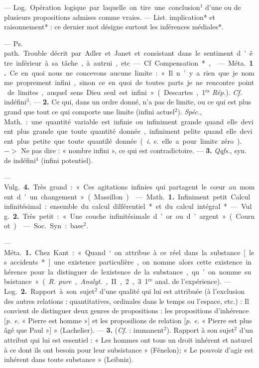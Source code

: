 \begin{itemize}[leftmargin=1cm, label=, itemsep=1pt]
 — \si{Log.} Opération logique
par laquelle on tire une conclusion$^1$
d’une ou de plusieurs propositions
admises comme vraies. — List.
implication* et raisonnement* : ce
dernier mot désigne surtout les inférences médiales*.

— \si{Ps. path.} Trouble décrit par
Adler et Janet et consistant dans le
sentiment d'être inférieur à sa
tâche, à autrui, etc — Cf Compensation*,

 — \si{Méta.} {\bf 1.} Ce en quoi nous ne
concevons aucune limite : « Il n’y a
rien que je nomme proprement
infini, sinon ce en quoi de toutes
parts je ne rencontre point de limites, auquel sens Dieu seul est
infini » (Descartes, 1$^\text{es}$ {\it Rép.}). {\it {\it Cf.}}
indéfini$^3$. — {\bf 2.} Ce qui, dans un
ordre donné, n'a pas de limite, ou
ce qui est plus grand que tout ce
qui comporte une limite (infini
actuel$^2$). {\it Spéc.}, \si{Math.} : une quantité
variable est infinie ou infiniment
grande quand elle devient plus
grande que toute quantité donnée,
infiniment pelite quand elle devient
plus petite que toute quantilé
donnée ({\it i. e.} elle a pour limite zéro).
$->$ Ne pas dire : « nombre infini »,
ce qui est contradictoire. — {\bf 3.} {\it Qqfs.},
syn. de indéfini$^4$ (infini potentiel).

— \si{Vulg.} {\bf 4.} Très grand : « Ces
agitations infinies qui partagent le
cœur au moment d’un changement » (Massillon).

 — \si{Math.} {\bf 1.} Infiniment
petit. Calcul infinitésimal : ensemble
du calcul dilférentiel* et du calcul
intégral*.

— \si{Vulg.} {\bf 2.} Très petit : « Une
couche infinitésimale d’or ou d’argent » (Cournot).

 — \si{Soc.} Syn. : base$^2$.

 — \si{Méta.} {\bf 1.} Chez Kant :
« Quand ‘on attribue à ce réel dans
la substance [les accidents*] une
existence particulière, on nomme
alors cette existence inhérence pour
la distinguer de lexistence de la
substance, qu’on nomme subsistance » ({\it R. pure}, {\it Analyt.}, II, 2, 3
1$^\text{re}$ anal. de l'expérience). — \si{Log.}
 {\bf 2.} Rapport à son sujet$^2$ d’une qualité
qui lui est attribuée (à l’exclusion
des autres relations : quantitatives,
ordinales dans le temps ou l’espace,
etc.) : Il convient de distinguer
deux genres de propositions : les
propositions d’inhérence [{\it p. e.} « Pierre
est homme »] et les proposilions de
relation [{\it p. e.} « Pierre est plus âgé
que Paul »] » (Lachelier). — {\bf 3.} ({\it {\it Cf.}} :
immanent$^2$). Rapport à son sujet$^2$
d'un attribut qui lui est essentiel :
« Les hommes ont tous un droit
inhérent et naturel à ce dont ils ont
besoin pour leur subsistance »
(Fénelon); « Le pouvoir d'agir est
inhérent dans toute substance »
(Leibniz).


\end{itemize}

